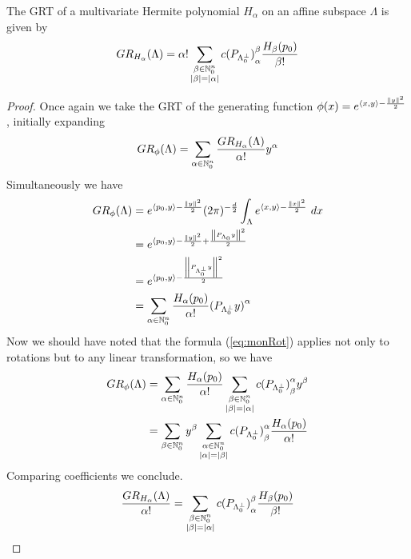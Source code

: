 \begin{proposition}
  The GRT of a multivariate Hermite polynomial $H_\alpha$ on an affine subspace $\Lambda$ is given by
  \[
    GR_{H_\alpha}(\Lambda) = \alpha! \sum_{\substack{\beta \in \mathbb{N}_0^n \\ |\beta| = |\alpha|}} {c(P_{\Lambda_0^\perp})}^\beta_\alpha \frac{H_\beta(p_0)}{\beta!}
  \]
\end{proposition}

\begin{proof}
  Once again we take the GRT of the generating function $\phi(x) = e^{\left\langle x, y \right\rangle - \frac{\left\| y \right\|^2}2}$, initially expanding
  \[
    GR_{\phi}(\Lambda) = \sum_{\alpha \in \mathbb{N}_0^n} \frac{GR_{H_\alpha}(\Lambda)}{\alpha!} y^\alpha
  \]
  Simultaneously we have
  \begin{align*}
    GR_\phi(\Lambda) 
    &= e^{\left\langle p_0, y \right\rangle -\frac{\left\| y \right\|^2}2} (2\pi)^{-\frac{d}2}\int_{\Lambda} e^{\left\langle x, y \right\rangle - \frac{\left\| x \right\|^2}2}~dx \\
    &= e^{\left\langle p_0, y \right\rangle - \frac{\left\| y \right\|^2}2 + \frac{\left\| P_{\Lambda_0} y \right\|^2}2} \\
    &= e^{\left\langle p_0, y \right\rangle - \frac{\left\| P_{\Lambda_0^\perp} y \right\|^2}2} \\
    &= \sum_{\alpha \in \mathbb{N}_0^n} \frac{H_\alpha(p_0)}{\alpha!} {(P_{\Lambda_0^\perp} y)}^\alpha
  \end{align*}
  Now we should have noted that the formula (\ref{eq:monRot}) applies not only to rotations but to any linear transformation, so we have 
  \begin{align*}
    GR_\phi(\Lambda) 
    &= \sum_{\alpha \in \mathbb{N}_0^n} \frac{H_\alpha(p_0)}{\alpha!} \sum_{\substack{\beta \in \mathbb{N}_0^n \\ |\beta| = |\alpha|}} {c(P_{\Lambda_0^\perp})}^\alpha_\beta y^\beta \\
    &= \sum_{\beta \in \mathbb{N}_0^n} y^\beta \sum_{\substack{\alpha \in \mathbb{N}_0^n \\ |\alpha| = |\beta|}} {c(P_{\Lambda_0^\perp})}^\alpha_\beta  \frac{H_\alpha(p_0)}{\alpha!}
  \end{align*}
  Comparing coefficients we conclude.
  \[
    \frac{GR_{H_\alpha}(\Lambda)}{\alpha!} = \sum_{\substack{\beta \in \mathbb{N}_0^n \\ |\beta| = |\alpha|}} {c(P_{\Lambda_0^\perp})}^\beta_\alpha \frac{H_\beta(p_0)}{\beta!}
  \]
\end{proof}



